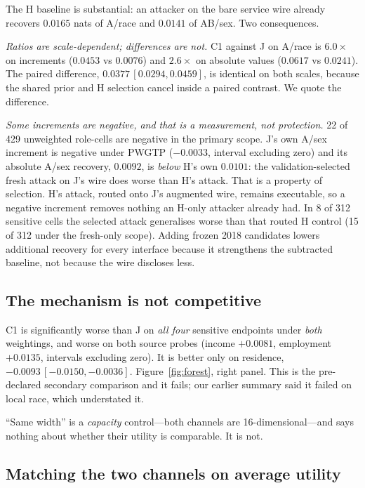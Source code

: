 \documentclass[10pt]{article}
\begin{document}
The H baseline is substantial: an attacker on the bare service wire already recovers $0.0165$ nats of
A/race and $0.0141$ of AB/sex. Two consequences.

\emph{Ratios are scale-dependent; differences are not.} C1 against J on A/race is $6.0\times$ on
increments ($0.0453$ vs $0.0076$) and $2.6\times$ on absolute values ($0.0617$ vs $0.0241$). The
paired difference, $0.0377\,[0.0294, 0.0459]$, is identical on both scales, because the shared prior
and H selection cancel inside a paired contrast. We quote the difference.

\emph{Some increments are negative, and that is a measurement, not protection.} 22 of 429 unweighted
role-cells are negative in the primary scope. J's own A/sex increment is negative under PWGTP
($-0.0033$, interval excluding zero) and its absolute A/sex recovery, $0.0092$, is \emph{below} H's
own $0.0101$: the validation-selected fresh attack on J's wire does worse than H's attack. That is a
property of selection. H's attack, routed onto J's augmented wire, remains executable, so a negative
increment removes nothing an H-only attacker already had. In 8 of 312 sensitive cells the selected
attack generalises worse than that routed H control (15 of 312 under the fresh-only scope). Adding
frozen 2018 candidates lowers additional recovery for every interface because it strengthens the
subtracted baseline, not because the wire discloses less.

\subsection{The mechanism is not competitive}

C1 is significantly worse than J on \emph{all four} sensitive endpoints under \emph{both} weightings,
and worse on both source probes (income $+0.0081$, employment $+0.0135$, intervals excluding zero).
It is better only on residence, $-0.0093\,[-0.0150,-0.0036]$. Figure~\ref{fig:forest}, right panel.
This is the pre-declared secondary comparison and it fails; our earlier summary said it failed on
local race, which understated it.

``Same width'' is a \emph{capacity} control---both channels are 16-dimensional---and says nothing
about whether their utility is comparable. It is not.

\subsection{Matching the two channels on average utility}
\end{document}
